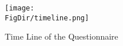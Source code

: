 \begin{figure}[ht]
	\centering
	\texttt{[image: \\FigDir/timeline.png]}
	\caption{Time Line of the Questionnaire}
	\label{fig:timeline}
\end{figure}